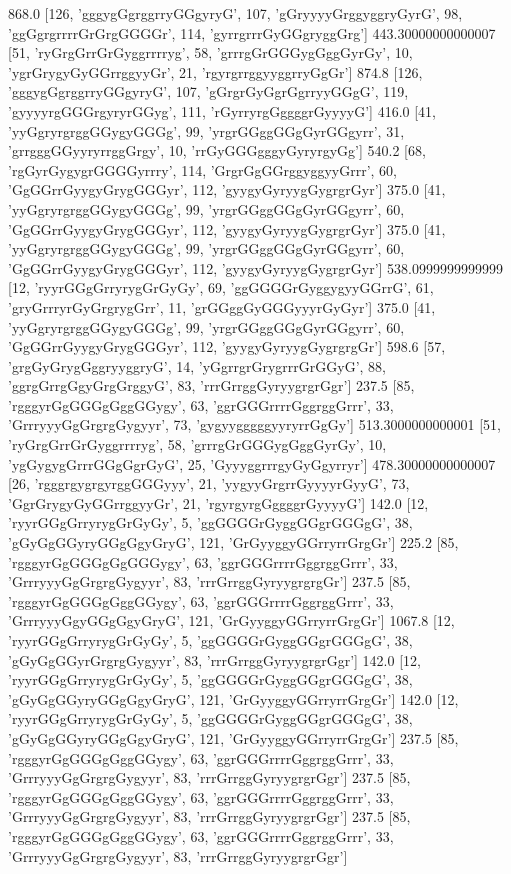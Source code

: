868.0 [126, 'gggygGgrggrryGGgyryG', 107, 'gGryyyyGrggyggryGyrG', 98, 'ggGgrgrrrrGrGrgGGGGr', 114, 'gyrrgrrrGyGGgryggGrg']
443.30000000000007 [51, 'ryGrgGrrGrGyggrrrryg', 58, 'grrrgGrGGGygGggGyrGy', 10, 'ygrGrygyGyGGrrggyyGr', 21, 'rgyrgrrggyyggrryGgGr']
874.8 [126, 'gggygGgrggrryGGgyryG', 107, 'gGrgrGyGgrGgrryyGGgG', 119, 'gyyyyrgGGGrgyryrGGyg', 111, 'rGyrryrgGggggrGyyyyG']
416.0 [41, 'yyGgryrgrggGGygyGGGg', 99, 'yrgrGGggGGgGyrGGgyrr', 31, 'grrgggGGyyryrrggGrgy', 10, 'rrGyGGGgggyGyryrgyGg']
540.2 [68, 'rgGyrGygygrGGGGyrrry', 114, 'GrgrGgGGrggyggyyGrrr', 60, 'GgGGrrGyygyGrygGGGyr', 112, 'gyygyGyryygGygrgrGyr']
375.0 [41, 'yyGgryrgrggGGygyGGGg', 99, 'yrgrGGggGGgGyrGGgyrr', 60, 'GgGGrrGyygyGrygGGGyr', 112, 'gyygyGyryygGygrgrGyr']
375.0 [41, 'yyGgryrgrggGGygyGGGg', 99, 'yrgrGGggGGgGyrGGgyrr', 60, 'GgGGrrGyygyGrygGGGyr', 112, 'gyygyGyryygGygrgrGyr']
538.0999999999999 [12, 'ryyrGGgGrryrygGrGyGy', 69, 'ggGGGGrGyggygyyGGrrG', 61, 'gryGrrryrGyGrgrygGrr', 11, 'grGGggGyGGGyyyrGyGyr']
375.0 [41, 'yyGgryrgrggGGygyGGGg', 99, 'yrgrGGggGGgGyrGGgyrr', 60, 'GgGGrrGyygyGrygGGGyr', 112, 'gyygyGyryygGygrgrgGr']
598.6 [57, 'grgGyGrygGggryyggryG', 14, 'yGgrrgrGrygrrrGrGGyG', 88, 'ggrgGrrgGgyGrgGrggyG', 83, 'rrrGrrggGyryygrgrGgr']
237.5 [85, 'rgggyrGgGGGgGggGGygy', 63, 'ggrGGGrrrrGggrggGrrr', 33, 'GrrryyyGgGrgrgGygyyr', 73, 'gygyygggggyyryrrGgGy']
513.3000000000001 [51, 'ryGrgGrrGrGyggrrrryg', 58, 'grrrgGrGGGygGggGyrGy', 10, 'ygGygygGrrrGGgGgrGyG', 25, 'GyyyggrrrgyGyGgyrryr']
478.30000000000007 [26, 'rgggrgygrgyrggGGGyyy', 21, 'yygyyGrgrrGyyyyrGyyG', 73, 'GgrGrygyGyGGrrggyyGr', 21, 'rgyrgyrgGggggrGyyyyG']
142.0 [12, 'ryyrGGgGrryrygGrGyGy', 5, 'ggGGGGrGyggGGgrGGGgG', 38, 'gGyGgGGyryGGgGgyGryG', 121, 'GrGyyggyGGrryrrGrgGr']
225.2 [85, 'rgggyrGgGGGgGgGGGygy', 63, 'ggrGGGrrrrGggrggGrrr', 33, 'GrrryyyGgGrgrgGygyyr', 83, 'rrrGrrggGyryygrgrgGr']
237.5 [85, 'rgggyrGgGGGgGggGGygy', 63, 'ggrGGGrrrrGggrggGrrr', 33, 'GrrryyyGgyGGgGgyGryG', 121, 'GrGyyggyGGrryrrGrgGr']
1067.8 [12, 'ryyrGGgGrryrygGrGyGy', 5, 'ggGGGGrGyggGGgrGGGgG', 38, 'gGyGgGGyrGrgrgGygyyr', 83, 'rrrGrrggGyryygrgrGgr']
142.0 [12, 'ryyrGGgGrryrygGrGyGy', 5, 'ggGGGGrGyggGGgrGGGgG', 38, 'gGyGgGGyryGGgGgyGryG', 121, 'GrGyyggyGGrryrrGrgGr']
142.0 [12, 'ryyrGGgGrryrygGrGyGy', 5, 'ggGGGGrGyggGGgrGGGgG', 38, 'gGyGgGGyryGGgGgyGryG', 121, 'GrGyyggyGGrryrrGrgGr']
237.5 [85, 'rgggyrGgGGGgGggGGygy', 63, 'ggrGGGrrrrGggrggGrrr', 33, 'GrrryyyGgGrgrgGygyyr', 83, 'rrrGrrggGyryygrgrGgr']
237.5 [85, 'rgggyrGgGGGgGggGGygy', 63, 'ggrGGGrrrrGggrggGrrr', 33, 'GrrryyyGgGrgrgGygyyr', 83, 'rrrGrrggGyryygrgrGgr']
237.5 [85, 'rgggyrGgGGGgGggGGygy', 63, 'ggrGGGrrrrGggrggGrrr', 33, 'GrrryyyGgGrgrgGygyyr', 83, 'rrrGrrggGyryygrgrGgr']
